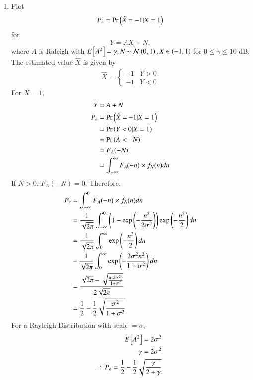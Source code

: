\begin{enumerate}[label=\thesection.\arabic*.,ref=\thesection.\theenumi]
\item
\label{ch4_sim}
Plot 
\begin{equation}
P_e = \Pr\left(\hat{X} = -1|X=1\right)
\end{equation}
%
for 
\begin{equation}
Y = AX+N,
\end{equation}
where $A$ is Raleigh with $E{}\left[A^2\right] = \gamma, N \sim \mathcal{N}\left(0,1\right), X \in \left(-1,1\right)$ for $0 \le \gamma \le 10$ dB.
\\
\solution The estimated value $\hat{X}$ is given by
\begin{align}
\hat{X} = 
\begin{cases}
+1 & Y>0\\
-1 & Y<0
\end{cases}
\end{align}
For $X = 1$, 
\begin{align}
Y &= A + N\\
P_e &= \Pr\left(\hat{X} = -1|X=1\right) \\
&= \Pr\left(Y<0 |X=1\right)\\
&= \Pr\left(A<-N\right)\\
&= F_A(-N)\\
&= \int_{-\infty}^{\infty} F_A(-n) \times f_N(n) dn
\end{align}
If $N>0$, $F_A(-N) = 0$. Therefore,
\begin{align}
P_e &= \int_{-\infty}^{0} F_A(-n) \times f_N(n) dn\\
&= \frac{1}{\sqrt{2\pi}}\int_{-\infty}^{0} \left(1-\exp \left( -\frac{n^2}{2\sigma^2} \right) \right)\exp \left( -\frac{n^2}{2} \right) dn\\
&= \frac{1}{\sqrt{2\pi}} \int_{0}^{\infty} \exp \left( -\frac{n^2}{2} \right)dn \nonumber \\
&- \frac{1}{\sqrt{2\pi}} \int_{0}^{\infty} \exp \left( -\frac{2 \sigma^2 n^2}{1+\sigma^2} \right) dn\\
&= \frac{\sqrt{2\pi} - \sqrt{\frac{\pi(2\sigma^2)}{1+\sigma^2}}}{2\sqrt{2\pi}}\\
&= \frac{1}{2} - \frac{1}{2}\sqrt{\frac{\sigma^2}{1+\sigma^2}}
\end{align}
For a Rayleigh Distribution with scale $= \sigma$,
\begin{align}
E\sbrak{A^2} = 2\sigma^2\\
\gamma = 2\sigma^2\\
\therefore P_e = \frac{1}{2} - \frac{1}{2}\sqrt{\frac{\gamma}{2+\gamma}}

\end{align}
\end{enumerate}
